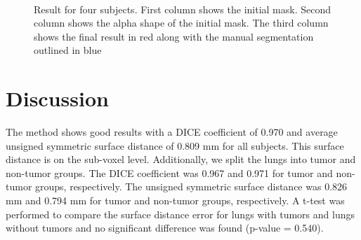 \documentclass{llncs}
\begin{document}
\begin{figure}[ht!]
{    \label{fig:PFS-020_final}
    }\\

  \caption{Result for four subjects. First column shows the initial mask. Second column shows the alpha shape of the initial mask. The third column shows the final result in red along with the manual segmentation outlined in blue}
  \label{fig:resultseg}
\end{figure}




%
\section{Discussion}
%

The method shows good results with a DICE coefficient of 0.970 and average unsigned symmetric surface distance of 0.809 mm for all subjects. This surface distance is on the sub-voxel level. Additionally, we split the lungs into tumor and non-tumor groups. The DICE coefficient was 0.967 and 0.971 for tumor and non-tumor groups, respectively. The unsigned symmetric surface distance was 0.826 mm and 0.794 mm for tumor and non-tumor groups, respectively. A t-test was performed to compare the surface distance error for lungs with tumors and lungs without tumors and no significant difference was found (p-value = 0.540).
\end{document}
